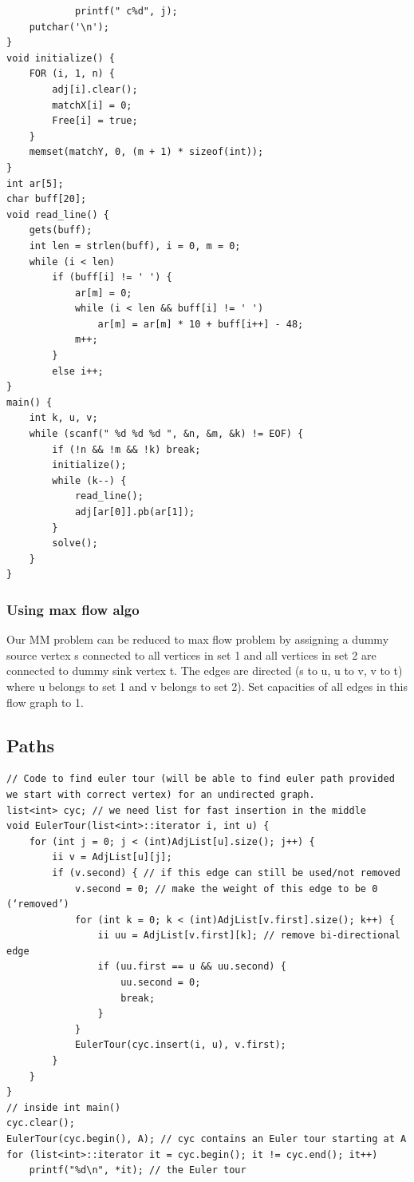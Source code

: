 \documentclass[8pt, a4paper, oneside, twocolumn]{extarticle}
\begin{document}
\begin{verbatim}
            printf(" c%d", j);
    putchar('\n');
}
void initialize() {
    FOR (i, 1, n) {
        adj[i].clear();
        matchX[i] = 0;
        Free[i] = true;
    }
    memset(matchY, 0, (m + 1) * sizeof(int));
}
int ar[5];
char buff[20];
void read_line() {
    gets(buff);
    int len = strlen(buff), i = 0, m = 0;
    while (i < len)
        if (buff[i] != ' ') {
            ar[m] = 0;
            while (i < len && buff[i] != ' ')
                ar[m] = ar[m] * 10 + buff[i++] - 48;
            m++;
        }
        else i++;
}
main() {
    int k, u, v;
    while (scanf(" %d %d %d ", &n, &m, &k) != EOF) {
        if (!n && !m && !k) break;
        initialize();
        while (k--) {
            read_line();
            adj[ar[0]].pb(ar[1]);
        }
        solve();
    }
}
\end{verbatim}
\subsubsection{Using max flow algo}
Our MM problem can be reduced to max flow problem by assigning a dummy source vertex s connected to all vertices in set 1 and all vertices in set 2 are connected to dummy sink vertex t. The edges are directed (s to u, u to v, v to t) where u belongs to set 1 and v belongs to set 2). Set capacities of all edges in this flow graph to 1.
\subsection{Paths}
\begin{verbatim}
// Code to find euler tour (will be able to find euler path provided we start with correct vertex) for an undirected graph.
list<int> cyc; // we need list for fast insertion in the middle
void EulerTour(list<int>::iterator i, int u) {
    for (int j = 0; j < (int)AdjList[u].size(); j++) {
        ii v = AdjList[u][j];
        if (v.second) { // if this edge can still be used/not removed
            v.second = 0; // make the weight of this edge to be 0 (‘removed’)
            for (int k = 0; k < (int)AdjList[v.first].size(); k++) {
                ii uu = AdjList[v.first][k]; // remove bi-directional edge
                if (uu.first == u && uu.second) {
                    uu.second = 0;
                    break;
                } 
            }
            EulerTour(cyc.insert(i, u), v.first);
        } 
    }
}
// inside int main()
cyc.clear();
EulerTour(cyc.begin(), A); // cyc contains an Euler tour starting at A
for (list<int>::iterator it = cyc.begin(); it != cyc.end(); it++)
    printf("%d\n", *it); // the Euler tour
\end{verbatim}
\end{document}
